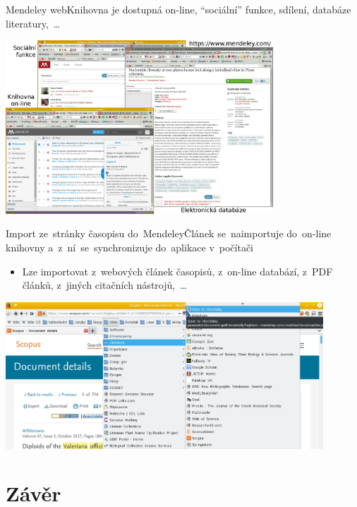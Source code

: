 \documentclass[compress, ucs, xelatex, 11pt, xcolor=svgnames, aspectratio=169,
	hyperref={
		bookmarks=true,
		unicode=true,
		colorlinks=true,
		pdftitle={Citacni software},
		plainpages=false,
		pdfauthor={Vojtech Zeisek},
		pdfsubject={Kratky uvod do citacniho software},
		pdfcreator={XeLaTeX},
		pdfkeywords={citace, reference, software, literatura},
		linkcolor=Crimson, %
		anchorcolor=Magenta, %
		citecolor=Magenta, %
		filecolor=Magenta, %
		menucolor=Magenta, %
		urlcolor=DarkTurquoise, %
		pdftex},
	url={hyphens, lowtilde} %
	]{beamer}
\begin{document}
\begin{frame}{Mendeley web}{Knihovna je dostupná on-line, \enquote{sociální} funkce, sdílení, databáze literatury,~\ldots}
	\begin{center}
		\includegraphics[height=6.5cm]{mendeley_web.png}
	\end{center}
\end{frame}

\begin{frame}{Import ze~stránky časopisu do~Mendeley}{Článek se~naimportuje do~on-line knihovny a~z~ní~se~synchronizuje do~aplikace v~počítači}
	\begin{itemize}
		\item Lze importovat z~webových článek časopisů, z~on-line databází, z~PDF článků, z~jiných citačních nástrojů,~\ldots
	\end{itemize}
	\begin{center}
		\includegraphics[height=5.5cm]{mendeley_web_import.png}
	\end{center}
\end{frame}

\section{Závěr}
\end{document}
